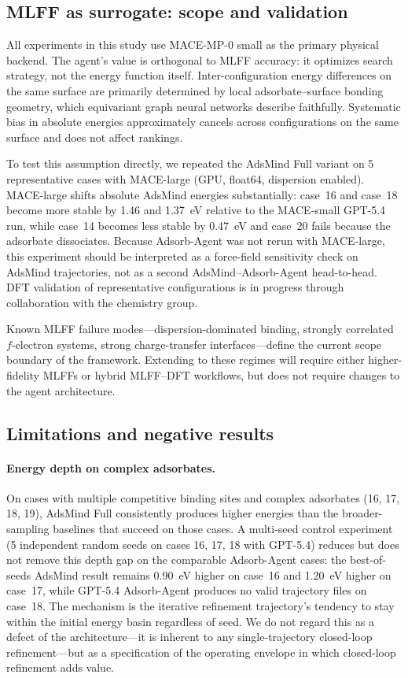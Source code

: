 \subsection{MLFF as surrogate: scope and validation}

All experiments in this study use MACE-MP-0 small as the primary physical backend.
The agent's value is orthogonal to MLFF accuracy: it optimizes search strategy, not the energy function itself.
Inter-configuration energy differences on the same surface are primarily determined by local adsorbate--surface bonding geometry, which equivariant graph neural networks describe faithfully.
Systematic bias in absolute energies approximately cancels across configurations on the same surface and does not affect rankings.

To test this assumption directly, we repeated the AdsMind Full variant on 5 representative cases with MACE-large (GPU, float64, dispersion enabled).
MACE-large shifts absolute AdsMind energies substantially: case~16 and case~18 become more stable by 1.46 and 1.37~eV relative to the MACE-small GPT-5.4 run, while case~14 becomes less stable by 0.47~eV and case~20 fails because the adsorbate dissociates.
Because Adsorb-Agent was not rerun with MACE-large, this experiment should be interpreted as a force-field sensitivity check on AdsMind trajectories, not as a second AdsMind--Adsorb-Agent head-to-head.
DFT validation of representative configurations is in progress through collaboration with the chemistry group.

Known MLFF failure modes---dispersion-dominated binding, strongly correlated $f$-electron systems, strong charge-transfer interfaces---define the current scope boundary of the framework.
Extending to these regimes will require either higher-fidelity MLFFs or hybrid MLFF--DFT workflows, but does not require changes to the agent architecture.

\subsection{Limitations and negative results}

\paragraph{Energy depth on complex adsorbates.}
On cases with multiple competitive binding sites and complex adsorbates (16, 17, 18, 19), AdsMind Full consistently produces higher energies than the broader-sampling baselines that succeed on those cases.
A multi-seed control experiment (5 independent random seeds on cases 16, 17, 18 with GPT-5.4) reduces but does not remove this depth gap on the comparable Adsorb-Agent cases: the best-of-seeds AdsMind result remains 0.90~eV higher on case~16 and 1.20~eV higher on case~17, while GPT-5.4 Adsorb-Agent produces no valid trajectory files on case~18.
The mechanism is the iterative refinement trajectory's tendency to stay within the initial energy basin regardless of seed.
We do not regard this as a defect of the architecture---it is inherent to any single-trajectory closed-loop refinement---but as a specification of the operating envelope in which closed-loop refinement adds value.

